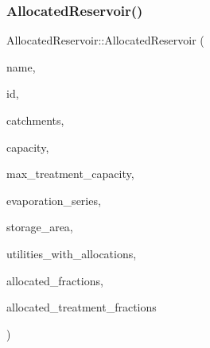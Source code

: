 \subsubsection{\texorpdfstring{Allocated\+Reservoir()}{AllocatedReservoir()}\hspace{0.1cm}{\footnotesize\ttfamily [3/5]}}
{\footnotesize\ttfamily Allocated\+Reservoir\+::\+Allocated\+Reservoir (\begin{DoxyParamCaption}\item[{const char $\ast$}]{name,  }\item[{const int}]{id,  }\item[{const vector$<$ \mbox{\hyperlink{classCatchment}{Catchment}} $\ast$$>$ \&}]{catchments,  }\item[{const double}]{capacity,  }\item[{const double}]{max\+\_\+treatment\+\_\+capacity,  }\item[{\mbox{\hyperlink{classEvaporationSeries}{Evaporation\+Series}} \&}]{evaporation\+\_\+series,  }\item[{double}]{storage\+\_\+area,  }\item[{vector$<$ int $>$ $\ast$}]{utilities\+\_\+with\+\_\+allocations,  }\item[{vector$<$ double $>$ $\ast$}]{allocated\+\_\+fractions,  }\item[{vector$<$ double $>$ $\ast$}]{allocated\+\_\+treatment\+\_\+fractions }\end{DoxyParamCaption})}

\mbox{\label{classAllocatedReservoir_a44ac982717a21a0b24bb3019d07ffe89}} 
